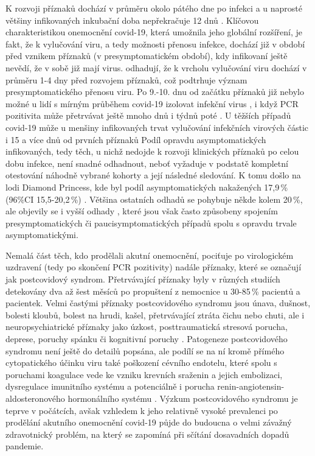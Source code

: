 K rozvoji příznaků dochází v průměru okolo pátého dne po infekci \cite{Zhang:2020,Xie:2020} a u naprosté většiny infikovaných inkubační doba nepřekračuje 12 dnů \cite{Wiersinga:2020}. Klíčovou charakteristikou onemocnění covid-19, která umožnila jeho globální rozšíření, je fakt, že k vylučování viru, a tedy možnosti přenosu infekce, dochází již v období před vznikem příznaků (v presymptomatickém období), kdy infikovaní ještě nevědí, že v sobě již mají virus. \cite{Jones:2021} odhadují, že k vrcholu vylučování viru dochází v průměru 1-4 dny před rozvojem příznaků, což podtrhuje význam presymptomatického přenosu viru. Po 9.-10. dnu od začátku příznaků již nebylo možné u lidí s mírným průběhem covid-19 izolovat infekční virus \cite{Wolfel:2020,Jones:2021}, 
i když PCR pozitivita může přetrvávat ještě mnoho dnů i týdnů poté \cite{Byrne:2020}. U těžších případů covid-19 může u menšiny infikovaných trvat vylučování infekčních virových částic i 15 a více dnů od prvních příznaků \cite{Kampen:2021} Podíl opravdu asymptomatických infikovaných, tedy těch, u nichž nedojde k rozvoji klinických příznaků po celou dobu infekce, není snadné odhadnout, neboť vyžaduje v podstatě kompletní otestování náhodně vybrané kohorty a její následné sledování. K tomu došlo na lodi Diamond Princess, kde byl podíl asymptomatických nakažených 17,9\,\% (96\%CI 15,5-20,2\,\%) \cite{Mizumoto:2020}. Většina ostatních odhadů se pohybuje někde kolem 20\,\%, ale objevily se i vyšší odhady \cite{Yanes-Lane:2020}, které jsou však často způsobeny spojením presymptomatických či paucisymptomatických případů spolu s opravdu trvale asymptomatickými.

Nemalá část těch, kdo prodělali akutní onemocnění, pociťuje po virologickém uzdravení (tedy po skončení PCR pozitivity) nadále příznaky, které se označují jak postcovidový syndrom. Přetrvávající příznaky byly v různých studiích detekovány dva až šest měsíců po propuštení z nemocnice u 30-85\,\% pacientů a pacientek. Velmi častými příznaky postcovidového syndromu jsou únava, dušnost, bolesti kloubů, bolest na hrudi, kašel, přetrvávající ztráta čichu nebo chuti, ale i neuropsychiatrické příznaky jako úzkost, posttraumatická stresová porucha, deprese, poruchy spánku či kognitivní poruchy \cite{Nalbandian:2021}. Patogeneze postcovidového syndromu není ještě do detailů popsána, ale podílí se na ní kromě přímého cytopatického účinku viru také poškození cévního endotelu, které spolu s poruchami koagulace vede ke vzniku krevních sraženin a jejich embolizaci, dysregulace imunitního systému a potenciálně i porucha renin-angiotensin-aldosteronového hormonálního systému \cite{Gupta:2020}. Výzkum postcovidového syndromu je teprve v počátcích, avšak vzhledem k jeho relativně vysoké prevalenci po prodělání akutního onemocnění covid-19 půjde do budoucna o velmi závažný zdravotnický problém, na který se zapomíná při sčítání dosavadních dopadů pandemie.

